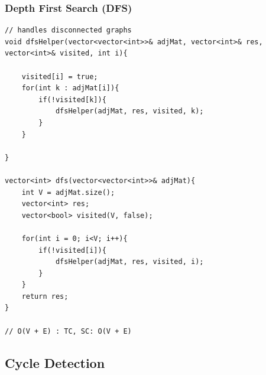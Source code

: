 \documentclass[11pt]{article}
\begin{document}
\subsubsection{Depth First Search (DFS)}
\begin{minipage}{\linewidth}
\begin{lstlisting}
// handles disconnected graphs
void dfsHelper(vector<vector<int>>& adjMat, vector<int>& res, vector<int>& visited, int i){

	visited[i] = true;
	for(int k : adjMat[i]){
		if(!visited[k]){
			dfsHelper(adjMat, res, visited, k);
		}
	}
	
}

vector<int> dfs(vector<vector<int>>& adjMat){
	int V = adjMat.size();
	vector<int> res;
	vector<bool> visited(V, false);
	
	for(int i = 0; i<V; i++){
		if(!visited[i]){
			dfsHelper(adjMat, res, visited, i);
		}
	}
	return res;	
}

// O(V + E) : TC, SC: O(V + E)
\end{lstlisting}
\end{minipage}

\subsection{Cycle Detection}
\end{document}
